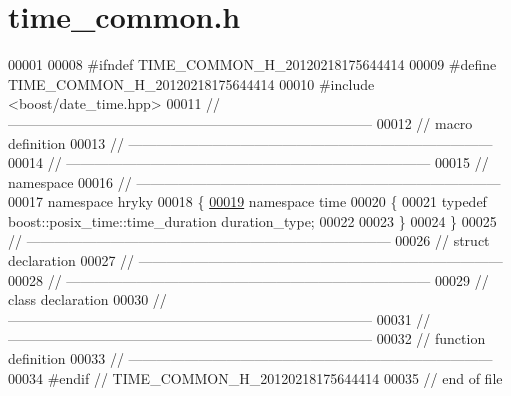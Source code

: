 \hypertarget{time__common_8h_source}{\section{time\-\_\-common.\-h}
}

\begin{DoxyCode}
00001 
00008 \textcolor{preprocessor}{#ifndef TIME\_COMMON\_H\_20120218175644414}
00009 \textcolor{preprocessor}{}\textcolor{preprocessor}{#define TIME\_COMMON\_H\_20120218175644414}
00010 \textcolor{preprocessor}{}\textcolor{preprocessor}{#include <boost/date\_time.hpp>}
00011 \textcolor{comment}{//
      ------------------------------------------------------------------------------}
00012 \textcolor{comment}{// macro definition}
00013 \textcolor{comment}{//
      ------------------------------------------------------------------------------}
00014 \textcolor{comment}{//
      ------------------------------------------------------------------------------}
00015 \textcolor{comment}{// namespace}
00016 \textcolor{comment}{//
      ------------------------------------------------------------------------------}
00017 \textcolor{keyword}{namespace }hryky
00018 \{
\hypertarget{time__common_8h_source_l00019}{}\hyperlink{namespacehryky_1_1time}{00019} \textcolor{keyword}{namespace }time
00020 \{
00021     \textcolor{keyword}{typedef} boost::posix\_time::time\_duration    duration\_type;
00022 
00023 \}
00024 \}
00025 \textcolor{comment}{//
      ------------------------------------------------------------------------------}
00026 \textcolor{comment}{// struct declaration}
00027 \textcolor{comment}{//
      ------------------------------------------------------------------------------}
00028 \textcolor{comment}{//
      ------------------------------------------------------------------------------}
00029 \textcolor{comment}{// class declaration}
00030 \textcolor{comment}{//
      ------------------------------------------------------------------------------}
00031 \textcolor{comment}{//
      ------------------------------------------------------------------------------}
00032 \textcolor{comment}{// function definition}
00033 \textcolor{comment}{//
      ------------------------------------------------------------------------------}
00034 \textcolor{preprocessor}{#endif // TIME\_COMMON\_H\_20120218175644414}
00035 \textcolor{preprocessor}{}\textcolor{comment}{// end of file}
\end{DoxyCode}

